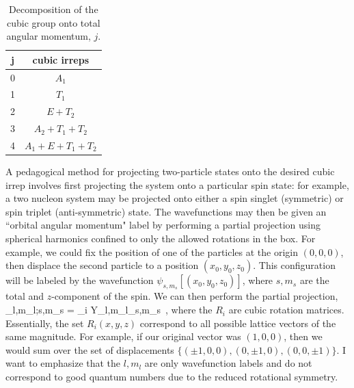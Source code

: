 \begin{table}[h!]
\label{tab:cubicirreps}
\begin{center}
\begin{tabular}{cc}
 j \hspace{1mm} & cubic irreps \\
 \hline
 0  \hspace{1mm}& $A_1$ \\
 1 \hspace{1mm} & $T_1$ \\
 2 \hspace{1mm} & $E+T_2$ \\
 3 \hspace{1mm} & $A_2 + T_1 + T_2$ \\
 4 \hspace{1mm} & $A_1 + E + T_1 + T_2$ \\
 \end{tabular}
 \end{center}
 \caption{Decomposition of the cubic group onto total angular momentum, $j$.}
 \end{table}
 
 A pedagogical method for projecting two-particle states onto the desired cubic irrep involves first projecting the system onto a particular spin state: for example, a two nucleon system may be projected onto either a spin singlet (symmetric) or spin triplet (anti-symmetric) state. The wavefunctions may then be given an ``orbital angular momentum" label by performing a partial projection using spherical harmonics confined to only the allowed rotations in the box. For example, we could fix the position of one of the particles at the origin $(0,0,0)$, then displace the second particle to a position $(x_0,y_0,z_0)$. This configuration will be labeled by the wavefunction $\psi_{s,m_s}\left[(x_0,y_0,z_0)\right]$, where $s,m_s$ are the total and $z$-component of the spin. We can then perform the partial projection, 
 \beq
 \tilde{\psi}_{l,m_l;s,m_s} = \sum_i Y_{l,m_l}\left[R_i(x_0,y_0,z_0)\right]\psi_{s,m_s}\left[R_i(x_0,y_0,z_0)\right] \ ,
 \eeq
 where the $R_i$ are cubic rotation matrices. Essentially, the set $R_i(x,y,z)$ correspond to all possible lattice vectors of the same magnitude. For example, if our original vector was $(1,0,0)$, then we would sum over the set of displacements $\{ (\pm 1,0,0),(0,\pm1,0),(0,0,\pm1)\}$. I want to emphasize that the $l,m_l$ are only wavefunction labels and do not correspond to good quantum numbers due to the reduced rotational symmetry.
 
